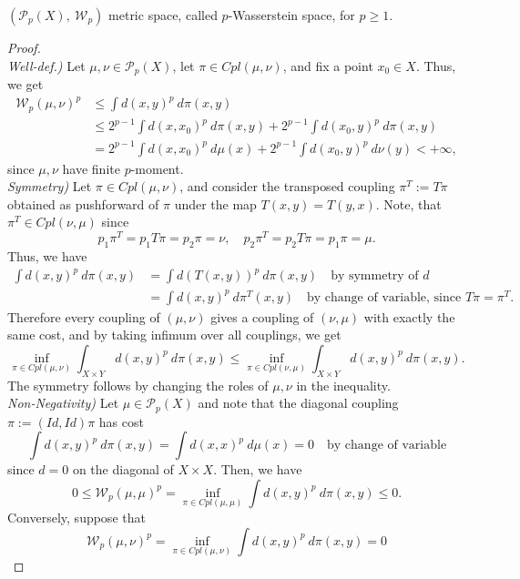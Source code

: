\documentclass[../main.tex]{subfiles}
\begin{document}
\begin{theorem}
    $(\mathcal{P}_p(X), \ \mathcal{W}_p)$ metric space, called $p$-Wasserstein space, for $p\geq 1$.
\end{theorem}
\begin{proof} \ \\
    \textit{Well-def.)} Let $\mu, \nu\in \mathcal{P}_p(X)$, let $\pi\in Cpl(\mu, \nu)$, and fix a point $x_0\in X$. Thus, we get
    \begin{align*}
        \mathcal{W}_p(\mu, \nu)^p 
        &\leq \int d(x, y)^p \ d\pi(x, y) \\
        &\leq 2^{p-1}\int d(x, x_0)^p \ d\pi(x, y) + 2^{p-1}\int d(x_0, y)^p \ d\pi(x, y) \\
        &= 2^{p-1}\int d(x, x_0)^p \ d\mu(x) + 2^{p-1}\int d(x_0, y)^p \ d\nu(y) < +\infty,
    \end{align*}
    since $\mu, \nu$ have finite $p$-moment. \\
    \textit{Symmetry)} Let $\pi\in Cpl(\mu, \nu)$, and consider the transposed coupling $\pi^T := T\pi$ obtained as pushforward of $\pi$ under the map $T(x, y) = T(y, x)$. Note, that $\pi^T\in Cpl(\nu, \mu)$ since
    $$
    p_1\pi^T = p_1T\pi = p_2\pi = \nu, \quad p_2\pi^T = p_2 T\pi = p_1\pi = \mu.
    $$
    Thus, we have
    \begin{align*}
        \int d(x, y)^p  \ d \pi(x, y) 
        &= \int d(T(x, y))^p \ d \pi(x, y) \quad \text{by symmetry of $d$} \\
        &= \int d(x, y)^p \ d\pi^T(x, y) \quad \text{by change of variable, since } T\pi = \pi^T.
    \end{align*}
    Therefore every coupling of $(\mu, \nu)$ gives a coupling of $(\nu, \mu)$ with exactly the same cost, and by taking infimum over all couplings, we get
    $$
    \inf_{\pi\in Cpl(\mu, \nu)} \int_{X\times Y} d(x, y)^p \ d\pi(x, y)
    \leq
    \inf_{\pi\in Cpl(\nu, \mu)} \int_{X\times Y} d(x, y)^p \ d\pi(x, y).
    $$
    The symmetry follows by changing the roles of $\mu, \nu$ in the inequality. \\
    \textit{Non-Negativity)} Let $\mu\in\mathcal{P}_p(X)$ and note that the diagonal coupling $\pi:=(Id, Id)\pi$ has cost
    $$
    \int d(x, y)^p \ d\pi(x, y) = \int d(x, x)^p \ d\mu(x) = 0 \quad \text{by change of variable}
    $$
    since $d=0$ on the diagonal of $X\times X$. Then, we have
    $$
    0 \leq \mathcal{W}_p(\mu, \mu)^p = \inf_{\pi\in Cpl(\mu, \mu)} \int d(x, y)^p \ d\pi(x, y) \leq 0.
    $$
    Conversely, suppose that 
    $$
    \mathcal{W}_p(\mu, \nu)^p = \inf_{\pi\in Cpl(\mu, \nu)} \int d(x, y)^p \ d\pi(x, y) = 0
$$
\end{proof}
\end{document}
